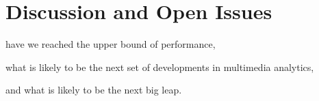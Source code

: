 
\section{Discussion and Open Issues}
\label{sec:discussion}

have we reached the upper bound of performance, 

what is likely to be the next set of developments in multimedia analytics, 

and what is likely to be the next big leap.